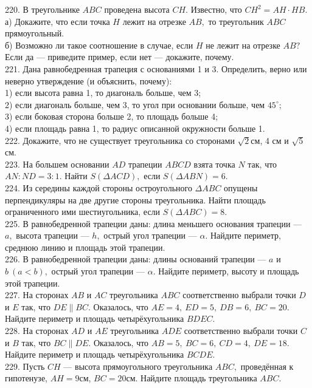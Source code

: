 220. В треугольнике $ABC$ проведена высота $CH.$ Известно, что $CH^2=AH\cdot HB.$\\
а) Докажите, что если точка $H$ лежит на отрезке $AB,$ то треугольник $ABC$ прямоугольный.\\
б) Возможно ли такое соотношение в случае, если $H$ не лежит на отрезке $AB?$ Если да --- приведите пример, если нет --- докажите, почему.\\
221. Дана равнобедренная трапеция с основаниями 1 и 3. Определить, верно или неверно утверждение (и объяснить, почему):\\
1) если высота равна 1, то диагональ больше, чем 3;\\
2) если диагональ больше, чем 3, то угол при основании больше, чем $45^\circ;$\\
3) если боковая сторона больше 2, то площадь больше 4;\\
4) если площадь равна 1, то радиус описанной окружности больше 1.\\
222. Докажите, что не существует треугольника со сторонами $\sqrt{2}$см, 4 см и $\sqrt{5}$ см.\\
223. На большем основании $AD$ трапеции $ABCD$ взята точка $N$ так, что $AN:ND=3:1.$ Найти $S(\Delta ACD),$ если $S(\Delta ABN)=6.$\\
224. Из середины каждой стороны остроугольного $\Delta ABC$ опущены перпендикуляры на две другие стороны треугольника. Найти площадь ограниченного ими шестиугольника, если $S(\Delta ABC)=8.$\\
225. В равнобедренной трапеции даны: длина меньшего основания трапеции --- $a,$ высота трапеции --- $h,$ острый угол трапеции --- $\alpha.$ Найдите периметр, среднюю линию и площадь этой трапеции.\\
226. В равнобедренной трапеции даны: длины оснований трапеции --- $a$ и $b\ (a<b),$ острый угол трапеции --- $\alpha.$ Найдите периметр, высоту и площадь этой трапеции.\\
227. На сторонах $AB$ и $AC$ треугольника $ABC$ соответственно выбрали точки $D$ и $E$ так, что $DE\parallel BC.$ Оказалось, что $AE=4,\ ED=5,\ DB=6,\ BC=20.$ Найдите периметр и площадь четырёхугольника $BDEC.$\\
228. На сторонах $AD$ и $AE$ треугольника $ADE$ соответственно выбрали точки $C$ и $B$ так, что $BC\parallel DE.$ Оказалось, что $AB=5,\ BC=6,\ CD=4,\ DE=18.$ Найдите периметр и площадь четырёхугольника $BCDE.$\\
229. Пусть $CH$ --- высота прямоугольного треугольника $ABC,$ проведённая к гипотенузе, $AH=9$см, $BC=20$см. Найдите площадь треугольника $ABC.$\\
